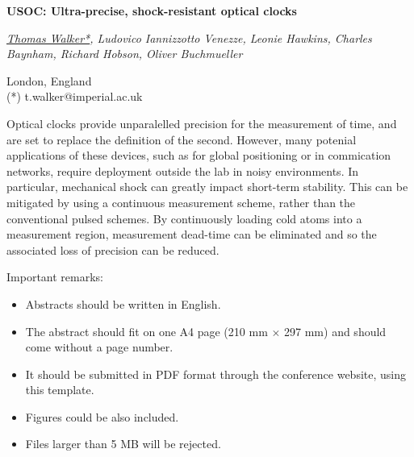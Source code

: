 \documentclass[11pt,a4paper]{article}
\newcommand{\abstracttitle}[1]{\parbox{\textwidth}
                              {\setlength{\baselineskip}{19pt}%
                               \begin{center}{\large\bfseries #1}\end{center}}}
\newcommand{\authors}[1]{\begin{center}#1\end{center}}
\newcommand{\addresses}[1]{\begin{center}#1\end{center}}
\begin{document}
%
\abstracttitle{USOC: Ultra-precise, shock-resistant optical clocks}
%
\authors{\textit{\underline{Thomas Walker*}, Ludovico Iannizzotto Venezze, Leonie Hawkins, Charles Baynham, Richard Hobson, Oliver Buchmueller}}

\addresses{{\small London, England\\ \vspace{0.2cm}
(*) t.walker@imperial.ac.uk}}

\setlength{\parskip}{\bigskipamount}

Optical clocks provide unparalelled precision for the measurement of time, and are set to replace the definition of the second. 
However, many potenial applications of these devices, such as for global positioning or in commication networks, require deployment outside the lab in noisy environments. 
In particular, mechanical shock can greatly impact short-term stability. This can be mitigated by using a continuous measurement scheme, rather than the conventional pulsed schemes.
By continuously loading cold atoms into a measurement region, measurement dead-time can be eliminated and so the associated loss of precision can be reduced. 


Important remarks:
\begin{itemize}
\item Abstracts should be written in English.

\item The abstract should fit on one A4 page (210 mm $\times$ 297 mm) and should come without a page number.

\item  It should be submitted in PDF format  through the conference website, using this template. 

\item Figures could be also included.

\item   Files larger than 5 MB will be rejected.

\end{itemize}



 \vspace{0.3cm}

%
\end{document}
